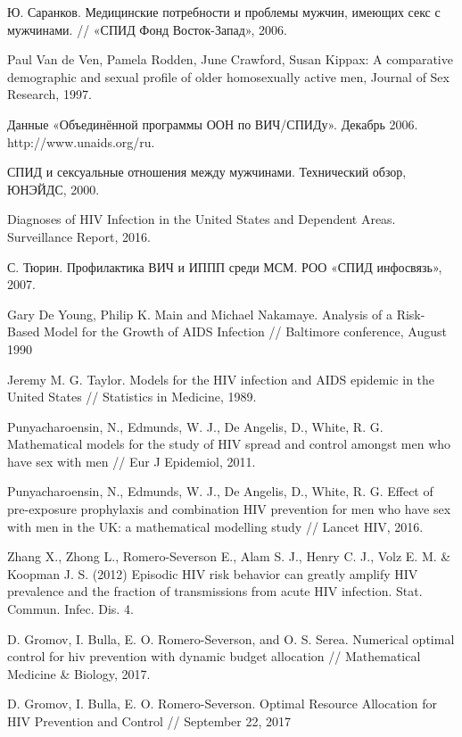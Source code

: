 \documentclass[a4paper]{report}
\begin{document}
\begin{thebibliography}{99}
		 Ю. Саранков. Медицинские потребности и проблемы мужчин, имеющих секс с мужчинами. // «СПИД Фонд Восток-Запад», 2006.
		
		Paul Van de Ven, Pamela Rodden, June Crawford, Susan Kippax: A comparative demographic and sexual profile of older homosexually active men, Journal of Sex Research, 1997.
		
		Данные «Объединённой программы ООН по ВИЧ/СПИДу». Декабрь 2006. http://www.unaids.org/ru.
		
		СПИД и сексуальные отношения между мужчинами. Технический обзор, ЮНЭЙДС, 2000.
		
		Diagnoses of HIV Infection in the United States and Dependent Areas. Surveillance Report, 2016.
		
		С. Тюрин. Профилактика ВИЧ и ИППП среди МСМ. РОО «СПИД инфосвязь», 2007.

		Gary De Young, Philip K. Main and Michael Nakamaye. Analysis of a Risk-Based Model for the Growth of AIDS Infection // Baltimore conference, August 1990
		
		Jeremy M. G. Taylor. Models for the HIV infection and AIDS epidemic in the United States // Statistics in Medicine, 1989.
		
		Punyacharoensin, N., Edmunds, W. J., De Angelis, D., White, R. G. Mathematical models for the study of HIV spread and control amongst men who have sex with men //
		Eur J Epidemiol, 2011.	
		
		Punyacharoensin, N., Edmunds, W. J., De Angelis, D., White, R. G. Effect of pre-exposure prophylaxis and combination HIV prevention for men who have sex with men in the UK: a mathematical modelling study //  Lancet HIV, 2016.
		
		Zhang X., Zhong L., Romero-Severson E., Alam S. J., Henry C. J., Volz E. M. \& Koopman J. S. (2012) Episodic HIV risk behavior can greatly amplify HIV prevalence and the fraction of transmissions from acute HIV infection. Stat. Commun. Infec. Dis. 4.
		
		D. Gromov, I. Bulla, E. O. Romero-Severson, and O. S. Serea. Numerical optimal control for hiv prevention with dynamic budget allocation // Mathematical Medicine \& Biology, 2017.
		
		D. Gromov, I. Bulla, E. O. Romero-Severson. Optimal Resource Allocation for HIV Prevention and Control // September 22, 2017
		

\end{thebibliography}
\end{document}
